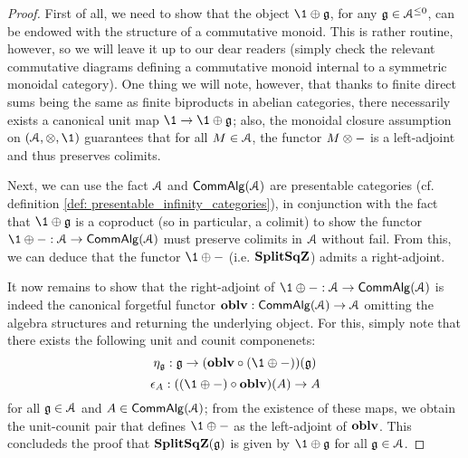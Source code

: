                     \begin{proof}
                        First of all, we need to show that the object $\1 \oplus \g$, for any $\mathfrak{g} \in \mathcal{A}^{\leq 0}$, can be endowed with the structure of a commutative monoid. This is rather routine, however, so we will leave it up to our dear readers (simply check the relevant commutative diagrams defining a commutative monoid internal to a symmetric monoidal category). One thing we will note, however, that thanks to finite direct sums being the same as finite biproducts in abelian categories, there necessarily exists a canonical unit map $\1 \to \1 \oplus \g$; also, the monoidal closure assumption on $(\calA, \tensor, \1)$ guarantees that for all $M \in \mathcal{A}$, the functor $M \tensor -$ is a left-adjoint and thus preserves colimits.
                        
                        Next, we can use the fact $\mathcal{A}$ and $\mathsf{Comm}\mathsf{Alg}(\mathcal{A})$ are presentable categories (cf. definition \ref{def: presentable_infinity_categories}), in conjunction with the fact that $\1 \oplus \g$ is a coproduct (so in particular, a colimit) to show the functor $\1 \oplus -: \calA \to \Comm\Alg(\calA)$ must preserve colimits in $\mathcal{A}$ without fail. From this, we can deduce that the functor $\1 \oplus -$ (i.e. $\mathbf{Split}\mathbf{Sq}\mathbf{Z}$) admits a right-adjoint.
                        
                        It now remains to show that the right-adjoint of $\1 \oplus -: \calA \to \Comm\Alg(\calA)$ is indeed the canonical forgetful functor $\mathbf{oblv}: \mathsf{Comm}\mathsf{Alg}(\mathcal{A}) \to \mathcal{A}$ omitting the algebra structures and returning the underlying object. For this, simply note that there exists the following unit and counit componenets:
                            $$\eta_{\g}: \g \to ( \oblv \circ (\1 \oplus -) )(\g)$$
                            $$\e_A: ( (\1 \oplus -) \circ \oblv )(A) \to A$$
                        for all $\mathfrak{g} \in \mathcal{A}$ and $A \in \mathsf{Comm}\mathsf{Alg}(\mathcal{A})$; from the existence of these maps, we obtain the unit-counit pair that defines $\1 \oplus -$ as the left-adjoint of $\mathbf{oblv}$. This concludeds the proof that $\mathbf{Split}\mathbf{Sq}\mathbf{Z}(\mathfrak{g})$ is given by $\1 \oplus \g$ for all $\mathfrak{g} \in \mathcal{A}$.
                    \end{proof}
